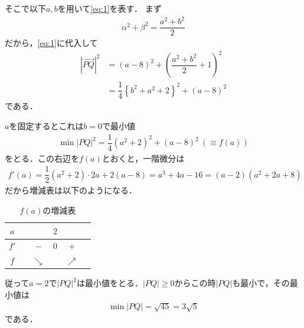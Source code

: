 \documentclass[../../main.tex]{subfiles}
\begin{document}
そこで以下$a,b$を用いて\cref{eq:1}を表す．
まず
\begin{align}
  \alpha^2+\beta^2=\dfrac{a^2+b^2}{2}
\end{align}
だから，\cref{eq:1}に代入して
\begin{align}
  |\overrightarrow{PQ}|^2
  &=(a-8)^2+\left(\dfrac{a^2+b^2}{2}+1\right)^2 \\
  &=\dfrac{1}{4}\left\{b^2+a^2+2\right\}^2+(a-8)^2 \label{eq:2}
\end{align}
である．

$a$を固定するとこれは$b=0$で最小値
\begin{align}
  \min|PQ|^2=\dfrac{1}{4}(a^2+2)^2+(a-8)^2\ (\equiv f(a))
\end{align}
をとる．この右辺を$f(a)$とおくと，一階微分は
\begin{align}
  f'(a)=\dfrac{1}{2}(a^2+2)\cdot2a+2(a-8)=a^3+4a-16=(a-2)(a^2+2a+8)
\end{align}
だから増減表は以下のようになる．

\begin{table}[htb]
  \centering
  \caption{$f(a)$の増減表}
  \begin{tabular}{c|ccccc}
    $a$ & & & $2$ & & \\
    \hline
    $f'$ & & $-$ & $0$ & $+$ & \\
    \hline
    $f$ & & $\searrow$ & & $\nearrow$ &
  \end{tabular}
\end{table}

従って$a=2$で$|PQ|^2$は最小値をとる．$|PQ|\ge0$からこの時$|PQ|$も最小で，その最小値は
\begin{align}
  \min|PQ|=\sqrt{45}=3\sqrt{5}
\end{align}
である．
\end{document}
